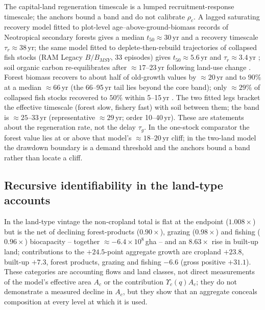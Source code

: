 \documentclass[11pt,a4paper]{article}
\newcommand{\Ups}{\Upsilon_c}
\begin{document}
The capital-land regeneration timescale is a lumped recruitment-response timescale; the anchors bound a band and do not calibrate $\rho_c$. A lagged saturating recovery model fitted to plot-level age--above-ground-biomass records of Neotropical secondary forests \citep[2ndFOR;][1{,}334 plots, 41 chronosequences, 35 good fits]{Poorter2016} gives a median $t_{50}\approx30$\,yr and a recovery timescale $\tau_r\approx38$\,yr; the same model fitted to deplete-then-rebuild trajectories of collapsed fish stocks (RAM Legacy $B/B_{MSY}$, 33 episodes) gives $t_{50}\approx5.6$\,yr and $\tau_r\approx3.4$\,yr \citep[cf.][]{HutchingsReynolds2004,Neubauer2013}; soil organic carbon re-equilibrates after $\approx17$--$23$\,yr following land-use change \citep{Poeplau2011}. Forest biomass recovers to about half of old-growth values by $\approx20$\,yr and to $90\%$ at a median $\approx66$\,yr \citep{Poorter2016} (the 66--95\,yr tail lies beyond the core band); only $\approx29\%$ of collapsed fish stocks recovered to $50\%$ within 5--15\,yr \citep{HutchingsReynolds2004}. The two fitted legs bracket the effective timescale (forest slow, fishery fast) with soil between them; the band is $\approx25$--$33$\,yr (representative $\approx29$\,yr; order 10--40\,yr). These are statements about the regeneration rate, not the delay $\tau_g$. In the one-stock comparator the forest value lies at or above that model's $\approx18$--$20$\,yr cliff; in the two-land model the drawdown boundary is a demand threshold and the anchors bound a band rather than locate a cliff.

\subsection{Recursive identifiability in the land-type accounts}\label{si:recursive}

In the land-type vintage the non-cropland total is flat at the endpoint ($1.008\times$) but is the net of declining forest-products ($0.90\times$), grazing ($0.98\times$) and fishing ($0.96\times$) biocapacity -- together $\approx-6.4\times10^{8}$\,gha -- and an $8.63\times$ rise in built-up land; contributions to the $+24.5$-point aggregate growth are cropland $+23.8$, built-up $+7.3$, forest products, grazing and fishing $-6.6$ (gross positive $+31.1$). These categories are accounting flows and land classes, not direct measurements of the model's effective area $A_c$ or the contribution $\Ups(q)A_c$; they do not demonstrate a measured decline in $A_c$, but they show that an aggregate conceals composition at every level at which it is used.
\end{document}
